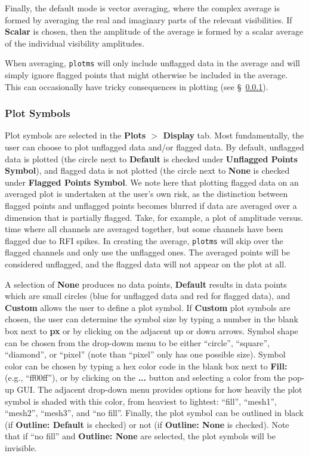Finally, the default mode is vector averaging, where the complex average is formed by averaging the real and imaginary parts of the relevant visibilities.  If {\bf Scalar} is chosen, then the amplitude of the average is formed by a scalar average of the individual visibility amplitudes.

When averaging, {\tt plotms} will only include unflagged data in the average and will simply ignore flagged points that might otherwise be included in the average. This can occasionally have tricky consequences in plotting (see \S~\ref{section:edit.plot.plotms.symbol}).


\subsubsection{Plot Symbols}
\label{section:edit.plot.plotms.symbol}

Plot symbols are selected in the {\bf Plots $>$ Display} tab. Most fundamentally, the user can choose to plot unflagged data and/or flagged data. By default, unflagged data is plotted (the circle next to {\bf Default} is checked under {\bf Unflagged Points Symbol}), and flagged data is not plotted (the circle next to {\bf None} is checked under {\bf Flagged Points Symbol}. We note here that plotting flagged data on an averaged plot is undertaken at the user's own risk, as the distinction between flagged points and unflagged points becomes blurred if data are averaged over a dimension that is partially flagged. Take, for example, a plot of amplitude versus. time where all channels are averaged together, but some channels have been flagged due to RFI spikes. In creating the average, {\tt plotms} will skip over the flagged channels and only use the unflagged ones. The averaged points will be considered unflagged, and the flagged data will not appear on the plot at all.

A selection of {\bf None} produces no data points, {\bf Default} results in data points which are small circles (blue for unflagged data and red for flagged data), and {\bf Custom} allows the user to define a plot symbol. If {\bf Custom} plot symbols are chosen, the user can determine the symbol size by typing a number in the blank box next to {\bf px} or by clicking on the adjacent up or down arrows. Symbol shape can be chosen from the drop-dowm menu to be either ``circle'', ``square'', ``diamond'', or ``pixel'' (note than ``pixel'' only has one possible size). Symbol color can be chosen by typing a hex color code in the blank box next to {\bf Fill:} (e.g., ``ff00ff''), or by clicking on the {\bf ...} button and selecting a color from the pop-up GUI. The adjacent drop-down menu provides options for how heavily the plot symbol is shaded with this color, from heaviest to lightest: ``fill'', ``mesh1'', ``mesh2'', ``mesh3'', and ``no fill''. Finally, the plot symbol can be outlined in black (if {\bf Outline: Default} is checked) or not (if {\bf Outline: None} is checked). Note that if ``no fill'' and {\bf Outline: None} are selected, the plot symbols will be invisible.

